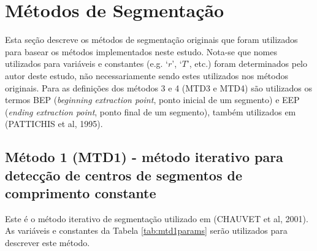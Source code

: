 \documentclass[
	12pt,				%
	openright,			%
	oneside,
	a4paper,			%
	english,			%
	francais,			%
	spanish,			%
	brazil				%
	]{abntex2}
\begin{document}
\section{Métodos de Segmentação}

	Esta seção descreve os métodos de segmentação originais que foram utilizados para basear os métodos implementados neste estudo. Nota-se que nomes utilizados para variáveis e constantes (e.g. `$r$', `$T$', etc.) foram determinados pelo autor deste estudo, não necessariamente sendo estes utilizados nos métodos originais. Para as definições dos métodos 3 e 4 (MTD3 e MTD4) são utilizados os termos BEP (\emph{beginning extraction point}, ponto inicial de um segmento)  e EEP (\emph{ending extraction point}, ponto final de um segmento), também utilizados em (PATTICHIS et al, 1995).
	
\subsection{Método 1 (MTD1) - método iterativo para detecção de centros de segmentos de comprimento constante}

	Este é o método iterativo de segmentação utilizado em (CHAUVET et al, 2001). As variáveis e constantes da Tabela \ref{tab:mtd1params} serão utilizados para descrever este método.
	
\begin{table}[htb]
\end{table}
	
\end{document}
